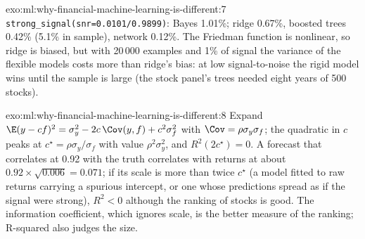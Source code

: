 \begin{solution}{exo:ml:why-financial-machine-learning-is-different:7}
\texttt{strong\_signal(snr=0.0101/0.9899)}: Bayes 1.01\%; ridge 0.67\%, boosted trees 0.42\% (5.1\% in sample), network
0.12\%. The Friedman function is nonlinear, so ridge is biased, but with 20\,000 examples and 1\% of signal the variance
of the flexible models costs more than ridge's bias: at low signal-to-noise the rigid model wins until the sample is
large (the stock panel's trees needed eight years of 500 stocks).
\end{solution}

\begin{solution}{exo:ml:why-financial-machine-learning-is-different:8}
Expand $\E(y - cf)^2 = \sigma_y^2 - 2c\,\Cov(y, f) + c^2\sigma_f^2$ with $\Cov = \rho\sigma_y\sigma_f$; the quadratic in
$c$ peaks at $c^\star = \rho\sigma_y/\sigma_f$ with value $\rho^2\sigma_y^2$, and $R^2(2c^\star) = 0$. A forecast that
correlates at 0.92 with the truth correlates with returns at about $0.92\times\sqrt{0.006} = 0.071$; if its scale is
more than twice $c^\star$ (a model fitted to raw returns carrying a spurious intercept, or one whose predictions spread as
if the signal were strong), $R^2 < 0$ although the ranking of stocks is good. The information coefficient, which ignores
scale, is the better measure of the ranking; R-squared also judges the size.
\end{solution}

